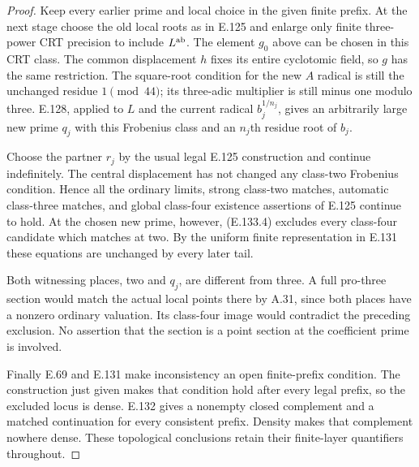 \begin{proof}
Keep every earlier prime and local choice in the
given finite prefix. At the next stage choose
the old local roots as in E.125 and enlarge
only finite three-power CRT precision to include
$L^{\rm ab}$. The element $g_0$ above can be
chosen in this CRT class. The common displacement
$h$ fixes its entire cyclotomic field, so $g$
has the same restriction. The square-root
condition for the new $A$ radical is still
the unchanged residue $1\pmod{44}$; its
three-adic multiplier is still minus one modulo
three. E.128, applied to $L$ and the current
radical $b_j^{1/n_j}$, gives an arbitrarily
large new prime $q_j$ with this Frobenius class
and an $n_j$th residue root of $b_j$.

Choose the partner $r_j$ by the usual legal
E.125 construction and continue indefinitely.
The central displacement has not changed any
class-two Frobenius condition. Hence all the
ordinary limits, strong class-two matches,
automatic class-three matches, and global
class-four existence assertions of E.125
continue to hold. At the chosen new prime,
however, (E.133.4) excludes every class-four
candidate which matches at two. By the uniform
finite representation in E.131 these equations
are unchanged by every later tail.

Both witnessing places, two and $q_j$, are
different from three. A full pro-three section
would match the actual local points there by
A.31, since both places have a nonzero ordinary
valuation. Its class-four image would contradict
the preceding exclusion. No assertion that the
section is a point section at the coefficient
prime is involved.

Finally E.69 and E.131 make inconsistency an
open finite-prefix condition. The construction
just given makes that condition hold after
every legal prefix, so the excluded locus is
dense. E.132 gives a nonempty closed complement
and a matched continuation for every consistent
prefix. Density makes that complement nowhere
dense. These topological conclusions retain
their finite-layer quantifiers throughout.
\end{proof}

